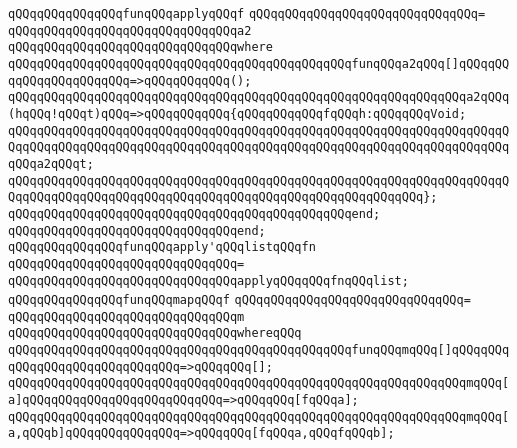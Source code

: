 \newline
\verb|qQQqqQQqqQQqqQQqfunqQQqapplyqQQqf|\newline
\verb|qQQqqQQqqQQqqQQqqQQqqQQqqQQqqQQq=|\newline
\verb|qQQqqQQqqQQqqQQqqQQqqQQqqQQqqQQqa2|\newline
\verb|qQQqqQQqqQQqqQQqqQQqqQQqqQQqqQQqwhere|\newline
\verb|qQQqqQQqqQQqqQQqqQQqqQQqqQQqqQQqqQQqqQQqqQQqqQQqfunqQQqa2qQQq[]qQQqqQQqqQQqqQQqqQQqqQQq=>qQQqqQQqqQQq();|\newline
\verb|qQQqqQQqqQQqqQQqqQQqqQQqqQQqqQQqqQQqqQQqqQQqqQQqqQQqqQQqqQQqqQQqa2qQQq(hqQQq!qQQqt)qQQq=>qQQqqQQqqQQq{qQQqqQQqqQQqfqQQqh:qQQqqQQqVoid;|\newline
\verb|qQQqqQQqqQQqqQQqqQQqqQQqqQQqqQQqqQQqqQQqqQQqqQQqqQQqqQQqqQQqqQQqqQQqqQQqqQQqqQQqqQQqqQQqqQQqqQQqqQQqqQQqqQQqqQQqqQQqqQQqqQQqqQQqqQQqqQQqqQQqqQQqa2qQQqt;|\newline
\verb|qQQqqQQqqQQqqQQqqQQqqQQqqQQqqQQqqQQqqQQqqQQqqQQqqQQqqQQqqQQqqQQqqQQqqQQqqQQqqQQqqQQqqQQqqQQqqQQqqQQqqQQqqQQqqQQqqQQqqQQqqQQqqQQq};|\newline
\verb|qQQqqQQqqQQqqQQqqQQqqQQqqQQqqQQqqQQqqQQqqQQqqQQqend;|\newline
\verb|qQQqqQQqqQQqqQQqqQQqqQQqqQQqqQQqend;|\newline
\newline
\newline
\verb|qQQqqQQqqQQqqQQqfunqQQqapply'qQQqlistqQQqfn|\newline
\verb|qQQqqQQqqQQqqQQqqQQqqQQqqQQqqQQq=|\newline
\verb|qQQqqQQqqQQqqQQqqQQqqQQqqQQqqQQqapplyqQQqqQQqfnqQQqlist;|\newline
\newline
\newline
\verb|qQQqqQQqqQQqqQQqfunqQQqmapqQQqf|\newline
\verb|qQQqqQQqqQQqqQQqqQQqqQQqqQQqqQQq=|\newline
\verb|qQQqqQQqqQQqqQQqqQQqqQQqqQQqqQQqm|\newline
\verb|qQQqqQQqqQQqqQQqqQQqqQQqqQQqqQQqwhereqQQq|\newline
\verb|qQQqqQQqqQQqqQQqqQQqqQQqqQQqqQQqqQQqqQQqqQQqqQQqfunqQQqmqQQq[]qQQqqQQqqQQqqQQqqQQqqQQqqQQqqQQq=>qQQqqQQq[];|\newline
\verb|qQQqqQQqqQQqqQQqqQQqqQQqqQQqqQQqqQQqqQQqqQQqqQQqqQQqqQQqqQQqqQQqmqQQq[a]qQQqqQQqqQQqqQQqqQQqqQQqqQQq=>qQQqqQQq[fqQQqa];|\newline
\verb|qQQqqQQqqQQqqQQqqQQqqQQqqQQqqQQqqQQqqQQqqQQqqQQqqQQqqQQqqQQqqQQqmqQQq[a,qQQqb]qQQqqQQqqQQqqQQq=>qQQqqQQq[fqQQqa,qQQqfqQQqb];|\newline
